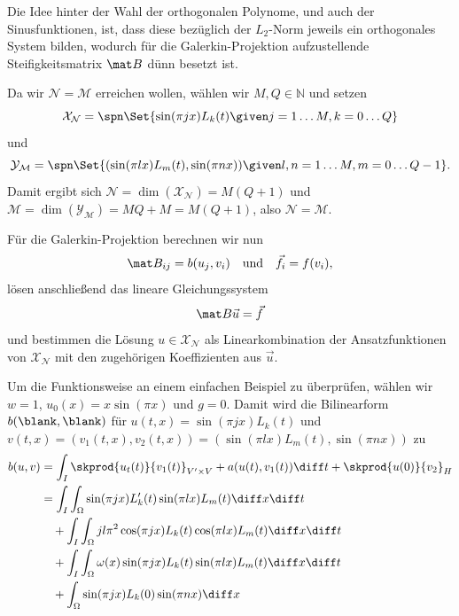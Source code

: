 Die Idee hinter der Wahl der orthogonalen Polynome, und auch der Sinusfunktionen, ist, dass diese bezüglich der $L_{2}$-Norm jeweils ein orthogonales System bilden, wodurch für die Galerkin-Projektion aufzustellende Steifigkeitsmatrix $\mat B$ dünn besetzt ist.

Da wir $\mathcal N = \mathcal M$ erreichen wollen, wählen wir $M, Q \in \mathbb{N}$ und setzen
\begin{equation}
    \mathcal X_{\mathcal N} = \spn\Set{ \sin(\pi j x) L_{k}(t) \given j = 1 \dots M, k = 0 \dots Q }
\end{equation}
und
\begin{equation}
    \mathcal Y_{\mathcal M} = \spn\Set{ (\sin(\pi l x) L_{m}(t), \sin(\pi n x)) \given l, n = 1 \dots M, m = 0 \dots Q - 1 }.
\end{equation}
Damit ergibt sich $\mathcal N = \dim(\mathcal X_{\mathcal N}) = M (Q + 1)$ und $\mathcal M = \dim(\mathcal Y_{\mathcal M}) = M Q + M = M ( Q + 1 )$, also $\mathcal N = \mathcal M$.

Für die Galerkin-Projektion berechnen wir nun
\begin{equation}
    \mat B_{ij} = b(u_{j}, v_{i}) \quad\text{und}\quad \vec f_{i} = f(v_{i}),
\end{equation}
lösen anschließend das lineare Gleichungssystem
\begin{equation}
    \mat B \vec u = \vec f
\end{equation}
und bestimmen die Lösung $u \in \mathcal X_{\mathcal N}$ als Linearkombination der Ansatzfunktionen von $\mathcal X_{\mathcal N}$ mit den zugehörigen Koeffizienten aus $\vec u$.

Um die Funktionsweise an einem einfachen Beispiel zu überprüfen, wählen wir $w = 1$, $u_{0}(x) = x \sin(\pi x)$ und $g = 0$.
Damit wird die Bilinearform $b(\blank, \blank)$ für $u(t, x) = \sin(\pi j x) L_{k}(t)$ und $v(t,x) = (v_{1}(t,x), v_{2}(t,x)) = (\sin(\pi l x) L_{m}(t), \sin(\pi n x))$ zu
\begin{subequations}
    \begin{align}
    b(u, v)
        &= \int_{I} \skprod{u_{t}(t)}{v_{1}(t)}_{V' \times V} + a(u(t), v_{1}(t)) \diff t + \skprod{u(0)}{v_{2}}_{H}
        \\&= \int_{I} \int_{\Omega} \sin(\pi j x) L_{k}'(t) \sin(\pi l x) L_{m}(t) \diff x \diff t \label{eq:int1}
        \\&\quad  + \int_{I} \int_{\Omega} j l \pi^2 \cos(\pi j x) L_{k}(t) \cos(\pi l x) L_{m}(t) \diff x \diff t  \label{eq:int2}
        \\&\quad + \int_{I} \int_{\Omega} \omega(x) \sin(\pi j x) L_{k}(t) \sin(\pi l x) L_{m}(t) \diff x \diff t  \label{eq:int3}
        \\&\quad + \int_{\Omega} \sin(\pi j x) L_{k}(0) \sin(\pi n x) \diff x  \label{eq:int4}
    \end{align}
\end{subequations}

